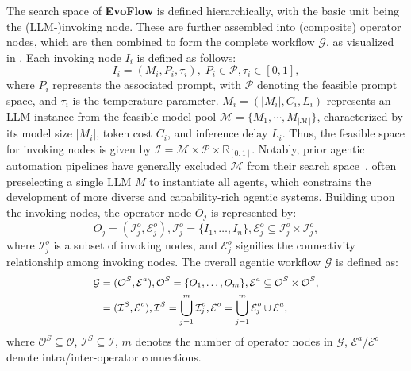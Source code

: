 \documentclass{article}
\theoremstyle{plain}
\theoremstyle{definition}
\theoremstyle{remark}
\newcommand{\ourmethod}{{\fontfamily{lmtt}\selectfont \textbf{EvoFlow}}\xspace}
\begin{document}
The search space of \ourmethod is defined hierarchically, with the basic unit being the (LLM-)invoking node. These are further assembled into (composite) operator nodes, which are then combined to form the complete workflow $\mathcal{G}$, as visualized in . Each invoking node ${I}_i$ is defined as follows:
\begin{equation}
{I}_i = (M_i, P_i, \tau_i), \; P_i \in \mathcal{P}, \tau_i\in {[0,1]},
\end{equation}
where $P_i$ represents the associated prompt, with $\mathcal{P}$ denoting the feasible prompt space, and $\tau_i$ is the temperature parameter. $M_i = (|M_i|, C_i, L_i)$ represents an LLM instance from the feasible model pool $\mathcal{M} = \{M_1, \cdots, M_{|\mathcal{M}|}\}$, characterized by its model size $|M_i|$, token cost $C_i$, and inference delay $L_i$. Thus, the feasible space for invoking nodes is given by $\mathcal{I} = \mathcal{M} \times \mathcal{P} \times \mathbb{R}_{[0,1]}$. Notably, prior agentic automation pipelines have generally excluded $\mathcal{M}$ from their search space~\cite{zhang2024aflow,yuan2024evoagent,zhuge2024gptswarm}, often preselecting a single LLM $M$ to instantiate all agents, which constrains the development of more diverse and capability-rich agentic systems.
Building upon the invoking nodes, the operator node ${O}_j$ is represented by:
\begin{equation}
{O}_j = (\mathcal{I}^o_j, \mathcal{E}^o_j),\mathcal{I}^o_j = \{I_1, \dots, I_n\},\mathcal{E}^o_j \subseteq \mathcal{I}^o_j \times\mathcal{I}^o_j,
\end{equation}
where $\mathcal{I}^o_j$ is a subset of invoking nodes, and $\mathcal{E}^o_j$ signifies the connectivity relationship among invoking nodes.
The overall agentic workflow $\mathcal{G}$ is defined as:
\begin{equation}
\small
\begin{aligned}
 \mathcal{G} & = (\mathcal{O}^S, \mathcal{E}^a), \mathcal{O}^S = \{O_1, \dots, O_m\}, \mathcal{E}^a \subseteq \mathcal{O}^S \times \mathcal{O}^S,\\
 & =(\mathcal{I}^S, \mathcal{E}^o),  \mathcal{I}^S = \bigcup_{j=1}^m \mathcal{I}^o_j, \mathcal{E}^o = \bigcup_{j=1}^m \mathcal{E}^o_j \cup \mathcal{E}^a,
 \end{aligned}
\end{equation}
where $\mathcal{O}^S\subseteq\mathcal{O}$, $\mathcal{I}^S\subseteq\mathcal{I}$, $m$ denotes the number of operator nodes in $\mathcal{G}$, \(\mathcal{E}^a\)/\(\mathcal{E}^o\) denote intra/inter-operator connections.
\end{document}

